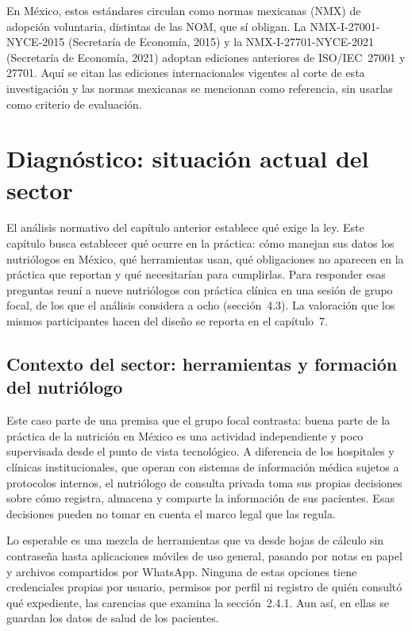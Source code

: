 \documentclass[12pt, a4paper]{article}
\makeatletter
\newcommand{\saltoseccion}{\par
  \ifx\@deferlist\@empty
    \ifdim\pagegoal<\maxdimen
      \ifdim\dimexpr\textheight-\pagegoal+\pagetotal\relax>0.5\textheight\clearpage\fi
    \fi
  \else\clearpage\fi}
\let\seccionbase\section
\renewcommand{\section}{\saltoseccion\seccionbase}
\makeatother
\begin{document}
En México, estos estándares circulan como normas mexicanas (NMX) de
adopción voluntaria, distintas de las NOM, que sí obligan. La
NMX-I-27001-NYCE-2015 (Secretaría de Economía, 2015) y la
NMX-I-27701-NYCE-2021 (Secretaría de Economía, 2021) adoptan
ediciones anteriores de ISO/IEC~27001 y 27701. Aquí se citan las
ediciones internacionales vigentes al corte de esta investigación
y las normas mexicanas se mencionan como referencia, sin usarlas
como criterio de evaluación.
\section{Diagnóstico: situación actual del sector}
El análisis normativo del capítulo anterior establece qué exige la ley.
Este capítulo busca establecer qué ocurre en la práctica: cómo manejan
sus datos los nutriólogos en México, qué herramientas usan, qué
obligaciones no aparecen en la práctica que reportan y qué necesitarían para cumplirlas.
Para responder esas preguntas reuní a nueve nutriólogos con
práctica clínica en una sesión de grupo focal, de los que el análisis
considera a ocho (sección~4.3). La valoración que
los mismos participantes hacen del diseño se reporta en el capítulo~7.

\subsection{Contexto del sector: herramientas y formación del nutriólogo}

Este caso parte de una premisa que el grupo focal contrasta: buena parte
de la práctica de la nutrición en México es una actividad independiente
y poco supervisada desde el punto de vista
tecnológico. A diferencia de los hospitales y clínicas institucionales,
que operan con sistemas de información médica sujetos a protocolos
internos, el nutriólogo de consulta privada toma sus propias
decisiones sobre cómo registra, almacena y comparte la información
de sus pacientes. Esas decisiones pueden no tomar en cuenta el
marco legal que las regula.

Lo esperable es una mezcla de herramientas que va desde hojas de cálculo
sin contraseña hasta aplicaciones móviles de uso general, pasando por
notas en papel y archivos compartidos por WhatsApp. Ninguna de estas
opciones tiene credenciales propias por
usuario, permisos por perfil ni
registro de quién consultó qué expediente, las carencias que examina la sección~2.4.1. Aun así, en ellas se guardan los datos de salud de los pacientes.
\end{document}
